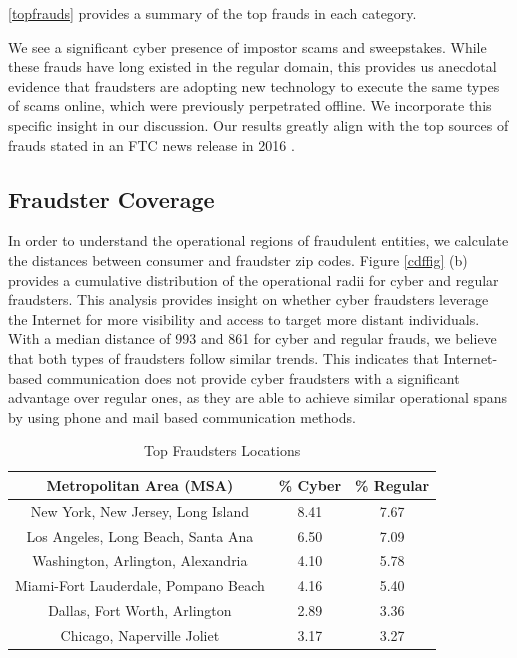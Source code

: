 \documentclass[conference]{IEEEtran}
\begin{document}
\ref{topfrauds} provides a summary of the top frauds in each category.



We see a significant cyber presence of impostor scams and sweepstakes. While these frauds have long existed in the regular domain, this provides us anecdotal evidence that fraudsters are adopting new technology to execute the same types of scams online, which were previously perpetrated offline. We incorporate this specific insight in our discussion. Our results greatly align with the top sources of frauds stated in an FTC news release in 2016 \cite{ftcpress2016}. 


\subsection{Fraudster Coverage}\label{fraudstercoverage}

In order to understand the operational regions of fraudulent entities, we calculate the distances between consumer and fraudster zip codes. Figure \ref{cdffig} (b) provides a cumulative distribution of the operational radii for cyber and regular fraudsters.  This analysis provides insight on whether cyber fraudsters leverage the Internet for more visibility and access to target more distant individuals. With a median distance of 993 and 861 for cyber and regular frauds, we believe that both types of fraudsters follow similar trends. This indicates that Internet-based communication does not provide cyber fraudsters with a significant advantage over regular ones, as they are able to achieve similar operational spans by using phone and mail based communication methods.



\begin{table}[h]
\centering
\begin{tabular}{c|c|c}
\hline
\bfseries Metropolitan Area (MSA) & \bfseries \% Cyber & \bfseries \% Regular\\
\hline
\hline
New York, New Jersey, Long Island & 8.41 & 7.67 \\
\hline
Los Angeles, Long Beach, Santa Ana & 6.50 & 7.09 \\
\hline
Washington, Arlington, Alexandria & 4.10 & 5.78 \\
\hline
Miami-Fort Lauderdale, Pompano Beach & 4.16 & 5.40 \\
\hline
Dallas, Fort Worth, Arlington & 2.89 & 3.36\\
\hline
Chicago, Naperville Joliet & 3.17 & 3.27 \\
\hline
\end{tabular}
\vspace{8pt}
\caption{Top Fraudsters Locations}\label{topareas}
\vspace{-15pt}
\end{table}
\end{document}
